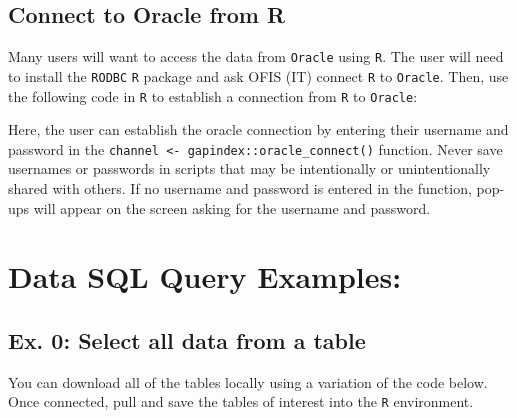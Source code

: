 \documentclass[
  letterpaper,
  oneside,
  open=any]{scrbook}
\begin{document}
\hypertarget{connect-to-oracle-from-r}{%
\subsection{Connect to Oracle from R}\label{connect-to-oracle-from-r}}

Many users will want to access the data from \texttt{Oracle} using
\texttt{R}. The user will need to install the \texttt{RODBC} \texttt{R}
package and ask OFIS (IT) connect \texttt{R} to \texttt{Oracle}. Then,
use the following code in \texttt{R} to establish a connection from
\texttt{R} to \texttt{Oracle}:

Here, the user can establish the oracle connection by entering their
username and password in the
\texttt{channel\ \textless{}-\ gapindex::oracle\_connect()} function.
Never save usernames or passwords in scripts that may be intentionally
or unintentionally shared with others. If no username and password is
entered in the function, pop-ups will appear on the screen asking for
the username and password.

\hypertarget{data-sql-query-examples}{%
\section{Data SQL Query Examples:}\label{data-sql-query-examples}}

\hypertarget{ex.-0-select-all-data-from-a-table}{%
\subsection{Ex. 0: Select all data from a
table}\label{ex.-0-select-all-data-from-a-table}}

You can download all of the tables locally using a variation of the code
below. Once connected, pull and save the tables of interest into the
\texttt{R} environment.
\end{document}
